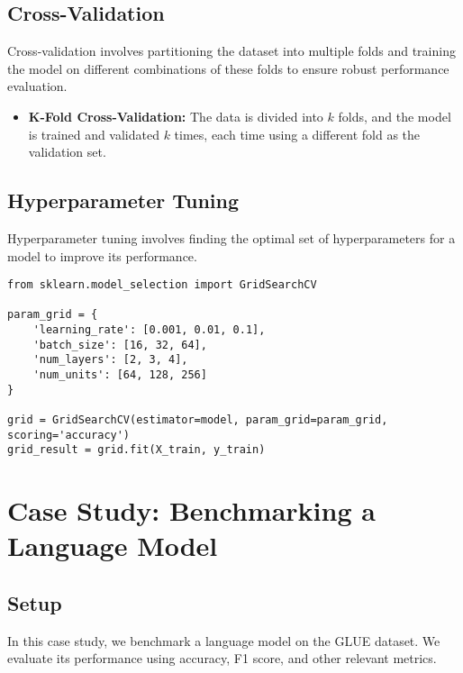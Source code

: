 \subsection{Cross-Validation}
Cross-validation involves partitioning the dataset into multiple folds and training the model on different combinations of these folds to ensure robust performance evaluation.

\begin{itemize}
    \item \textbf{K-Fold Cross-Validation:} The data is divided into \( k \) folds, and the model is trained and validated \( k \) times, each time using a different fold as the validation set.
\end{itemize}

\subsection{Hyperparameter Tuning}
Hyperparameter tuning involves finding the optimal set of hyperparameters for a model to improve its performance.

\begin{verbatim}
from sklearn.model_selection import GridSearchCV

param_grid = {
    'learning_rate': [0.001, 0.01, 0.1],
    'batch_size': [16, 32, 64],
    'num_layers': [2, 3, 4],
    'num_units': [64, 128, 256]
}

grid = GridSearchCV(estimator=model, param_grid=param_grid, scoring='accuracy')
grid_result = grid.fit(X_train, y_train)
\end{verbatim}

\section{Case Study: Benchmarking a Language Model}

\subsection{Setup}
In this case study, we benchmark a language model on the GLUE dataset. We evaluate its performance using accuracy, F1 score, and other relevant metrics.

